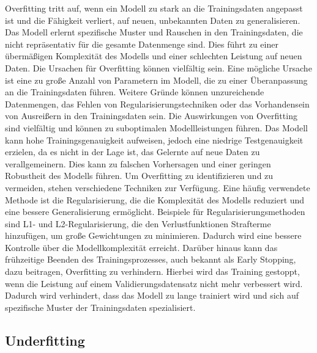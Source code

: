     Overfitting tritt auf, wenn ein Modell zu stark an die Trainingsdaten angepasst ist und die Fähigkeit verliert, auf neuen, unbekannten Daten zu generalisieren. Das Modell erlernt spezifische Muster und Rauschen in den Trainingsdaten, die nicht repräsentativ für die gesamte Datenmenge sind. Dies führt zu einer übermäßigen Komplexität des Modells und einer schlechten Leistung auf neuen Daten.
    Die Ursachen für Overfitting können vielfältig sein. Eine mögliche Ursache ist eine zu große Anzahl von Parametern im Modell, die zu einer Überanpassung an die Trainingsdaten führen. Weitere Gründe können unzureichende Datenmengen, das Fehlen von Regularisierungstechniken oder das Vorhandensein von Ausreißern in den Trainingsdaten sein.
    Die Auswirkungen von Overfitting sind vielfältig und können zu suboptimalen Modellleistungen führen. Das Modell kann hohe Trainingsgenauigkeit aufweisen, jedoch eine niedrige Testgenauigkeit erzielen, da es nicht in der Lage ist, das Gelernte auf neue Daten zu verallgemeinern. Dies kann zu falschen Vorhersagen und einer geringen Robustheit des Modells führen.
    Um Overfitting zu identifizieren und zu vermeiden, stehen verschiedene Techniken zur Verfügung. 
    Eine häufig verwendete Methode ist die Regularisierung, die die Komplexität des Modells reduziert und eine bessere Generalisierung ermöglicht. Beispiele für Regularisierungsmethoden sind L1- und L2-Regularisierung, die den Verlustfunktionen Strafterme hinzufügen, um große Gewichtungen zu minimieren. Dadurch wird eine bessere Kontrolle über die Modellkomplexität erreicht.
    Darüber hinaus kann das frühzeitige Beenden des Trainingsprozesses, auch bekannt als Early Stopping, dazu beitragen, Overfitting zu verhindern. Hierbei wird das Training gestoppt, wenn die Leistung auf einem Validierungsdatensatz nicht mehr verbessert wird. Dadurch wird verhindert, dass das Modell zu lange trainiert wird und sich auf spezifische Muster der Trainingsdaten spezialisiert.

\subsection{Underfitting}

